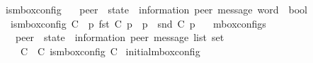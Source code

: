 \begin{isabellebody}
\isamarkuptrue%
%
\endisatagdocument
{\isafolddocument}%
%
\isadelimdocument
%
\endisadelimdocument
{}\isamarkupfalse%
\ is{\isacharunderscore}{\kern0pt}mbox{\isacharunderscore}{\kern0pt}config\isanewline
\ \ {\isacharcolon}{\kern0pt}{\isacharcolon}{\kern0pt}\ {\isachardoublequoteopen}{\isacharparenleft}{\kern0pt}{\isacharprime}{\kern0pt}peer\ {\isasymRightarrow}\ {\isacharparenleft}{\kern0pt}{\isacharprime}{\kern0pt}state\ {\isasymtimes}\ {\isacharparenleft}{\kern0pt}{\isacharprime}{\kern0pt}information{\isacharcomma}{\kern0pt}\ {\isacharprime}{\kern0pt}peer{\isacharparenright}{\kern0pt}\ message\ word{\isacharparenright}{\kern0pt}{\isacharparenright}{\kern0pt}\ {\isasymRightarrow}\ bool{\isachardoublequoteclose}\ \isanewline
\ \ {\isachardoublequoteopen}is{\isacharunderscore}{\kern0pt}mbox{\isacharunderscore}{\kern0pt}config\ C\ {\isasymequiv}\ {\isacharparenleft}{\kern0pt}{\isasymforall}p{\isachardot}{\kern0pt}\ fst\ {\isacharparenleft}{\kern0pt}C\ p{\isacharparenright}{\kern0pt}\ {\isasymin}\ {\isasymS}{\isacharparenleft}{\kern0pt}p{\isacharparenright}{\kern0pt}\ {\isasymand}\ snd\ {\isacharparenleft}{\kern0pt}C\ p{\isacharparenright}{\kern0pt}\ {\isasymin}\ {\isasymM}\isactrlsup {\isacharasterisk}{\kern0pt}{\isacharparenright}{\kern0pt}{\isachardoublequoteclose}\isanewline
\isanewline
%
\isanewline
{}\isamarkupfalse%
\ mbox{\isacharunderscore}{\kern0pt}configs\ \isanewline
\ \ {\isacharcolon}{\kern0pt}{\isacharcolon}{\kern0pt}\ {\isachardoublequoteopen}{\isacharparenleft}{\kern0pt}{\isacharprime}{\kern0pt}peer\ {\isasymRightarrow}\ {\isacharprime}{\kern0pt}state\ {\isasymtimes}\ {\isacharparenleft}{\kern0pt}{\isacharprime}{\kern0pt}information{\isacharcomma}{\kern0pt}\ {\isacharprime}{\kern0pt}peer{\isacharparenright}{\kern0pt}\ message\ list{\isacharparenright}{\kern0pt}\ set{\isachardoublequoteclose}\ \ {\isacharparenleft}{\kern0pt}{\isachardoublequoteopen}{\isasymC}\isactrlsub {\isasymmm}{\isachardoublequoteclose}{\isacharparenright}{\kern0pt}\ \isanewline
\ \ {\isachardoublequoteopen}{\isasymC}\isactrlsub {\isasymmm}\ {\isasymequiv}\ {\isacharbraceleft}{\kern0pt}C\ {\isacharbar}{\kern0pt}\ C{\isachardot}{\kern0pt}\ is{\isacharunderscore}{\kern0pt}mbox{\isacharunderscore}{\kern0pt}config\ C{\isacharbraceright}{\kern0pt}{\isachardoublequoteclose}\isanewline
\isanewline
{}\isamarkupfalse%
\ initial{\isacharunderscore}{\kern0pt}mbox{\isacharunderscore}{\kern0pt}config\isanewline

\end{isabellebody}

